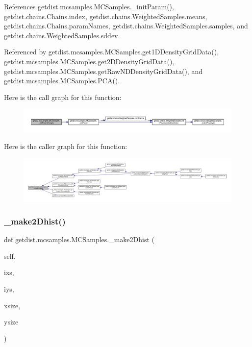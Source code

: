 References getdist.\+mcsamples.\+M\+C\+Samples.\+\_\+init\+Param(), getdist.\+chains.\+Chains.\+index, getdist.\+chains.\+Weighted\+Samples.\+means, getdist.\+chains.\+Chains.\+param\+Names, getdist.\+chains.\+Weighted\+Samples.\+samples, and getdist.\+chains.\+Weighted\+Samples.\+sddev.



Referenced by getdist.\+mcsamples.\+M\+C\+Samples.\+get1\+D\+Density\+Grid\+Data(), getdist.\+mcsamples.\+M\+C\+Samples.\+get2\+D\+Density\+Grid\+Data(), getdist.\+mcsamples.\+M\+C\+Samples.\+get\+Raw\+N\+D\+Density\+Grid\+Data(), and getdist.\+mcsamples.\+M\+C\+Samples.\+P\+C\+A().

Here is the call graph for this function\+:
\nopagebreak
\begin{figure}[H]
\begin{center}
\leavevmode
\includegraphics[width=350pt]{classgetdist_1_1mcsamples_1_1MCSamples_a6b6dd422ba0e76f758c0ac875ea6ad74_cgraph}
\end{center}
\end{figure}
Here is the caller graph for this function\+:
\nopagebreak
\begin{figure}[H]
\begin{center}
\leavevmode
\includegraphics[width=350pt]{classgetdist_1_1mcsamples_1_1MCSamples_a6b6dd422ba0e76f758c0ac875ea6ad74_icgraph}
\end{center}
\end{figure}
\mbox{\label{classgetdist_1_1mcsamples_1_1MCSamples_a0da5ffb0dd8b41cea131a5cb8fd9202f}} 
\subsubsection{\texorpdfstring{\+\_\+make2\+Dhist()}{\_make2Dhist()}}
{\footnotesize\ttfamily def getdist.\+mcsamples.\+M\+C\+Samples.\+\_\+make2\+Dhist (\begin{DoxyParamCaption}\item[{}]{self,  }\item[{}]{ixs,  }\item[{}]{iys,  }\item[{}]{xsize,  }\item[{}]{ysize }\end{DoxyParamCaption})\hspace{0.3cm}{\ttfamily [private]}}



